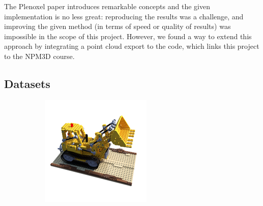 \documentclass{article}
\begin{document}
The Plenoxel paper introduces remarkable concepts and the given implementation is no less great: reproducing the results was a challenge, and improving the given method (in terms of speed or quality of results) was impossible in the scope of this project. However, we found a way to extend this approach by integrating a point cloud export to the code, which links this project to the NPM3D course.   

\subsection{Datasets}

\begin{figure}[!h]
 \centering

\begin{subfigure}{.24\textwidth}
  \centering
  \includegraphics[width=\linewidth]{figs/results/lego_ref.png}  
\end{subfigure}
\begin{subfigure}{.24\textwidth}
  \centering

\end{subfigure}
\end{figure}
\end{document}
